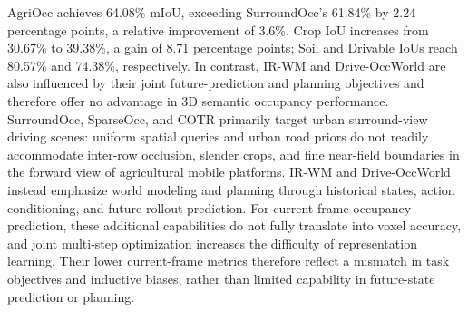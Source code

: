 \documentclass[a4paper,fleqn]{cas-sc}
\begin{document}
\begin{table}[pos=htbp]
\centering
\caption{3D semantic occupancy performance on AgriOcc-Dataset. IoUs are reported in \%, and inference time in ms/frame.}
\label{tab:main}
\end{table}
 
AgriOcc achieves 64.08\% mIoU, exceeding SurroundOcc's 61.84\% by 2.24 percentage points, a relative improvement of 3.6\%.
Crop IoU increases from 30.67\% to 39.38\%, a gain of 8.71 percentage points; Soil and Drivable IoUs reach 80.57\% and 74.38\%, respectively.
In contrast, IR-WM and Drive-OccWorld are also influenced by their joint future-prediction and planning objectives and therefore offer no advantage in 3D semantic occupancy performance.
SurroundOcc, SparseOcc, and COTR primarily target urban surround-view driving scenes: uniform spatial queries and urban road priors do not readily accommodate inter-row occlusion, slender crops, and fine near-field boundaries in the forward view of agricultural mobile platforms.
IR-WM and Drive-OccWorld instead emphasize world modeling and planning through historical states, action conditioning, and future rollout prediction. For current-frame occupancy prediction, these additional capabilities do not fully translate into voxel accuracy, and joint multi-step optimization increases the difficulty of representation learning.
Their lower current-frame metrics therefore reflect a mismatch in task objectives and inductive biases, rather than limited capability in future-state prediction or planning.
\end{document}
